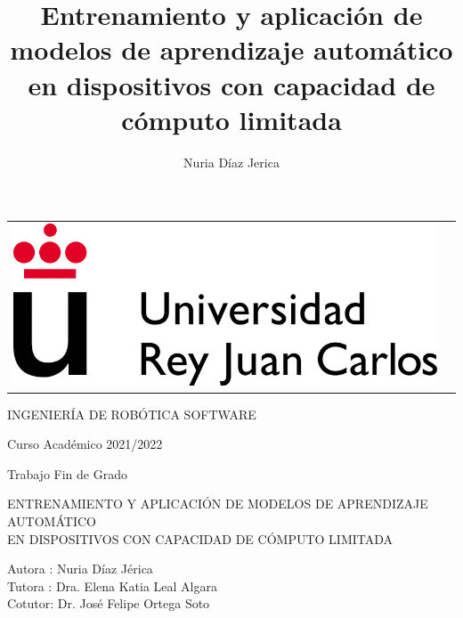 \documentclass[a4paper, 12pt]{book}
\title{Entrenamiento y aplicación de modelos de aprendizaje automático en dispositivos con capacidad de cómputo limitada}
\author{Nuria Díaz Jerica}
\begin{document}
 


\begin{titlepage}
\begin{center}
\begin{tabular}[c]{c c}
\includegraphics[scale=1.5]{img/LogoURJC.png}
\\
\end{tabular}

\vspace{3cm}

\Large 
INGENIERÍA DE ROBÓTICA SOFTWARE

\vspace{0.4cm}

\large
Curso Académico 2021/2022

\vspace{0.8cm}

Trabajo Fin de Grado

\vspace{2cm}

\LARGE ENTRENAMIENTO Y APLICACIÓN DE MODELOS DE APRENDIZAJE AUTOMÁTICO \\
EN DISPOSITIVOS CON CAPACIDAD DE CÓMPUTO LIMITADA

\vspace{3cm}

\large
Autora : Nuria Díaz Jérica \\
Tutora : Dra. Elena Katia Leal Algara \\
Cotutor: Dr. José Felipe Ortega Soto
\end{center}
\end{titlepage}
\end{document}
